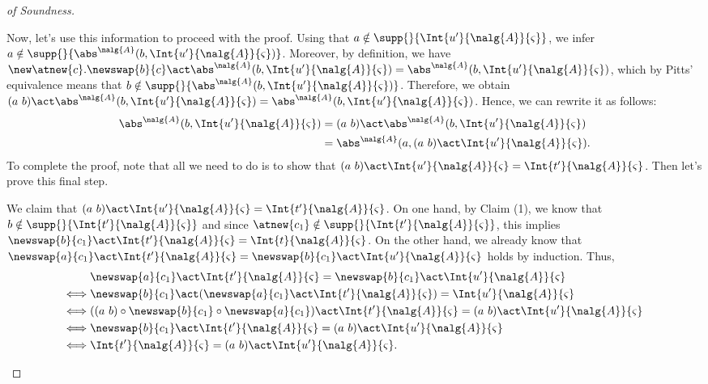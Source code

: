 \begin{proof}[of Soundness]
\begin{itemize}
            Now, let's use this information to proceed with the proof. Using that $a\notin\supp{}{\Int{u'}{\nalg{A}}{\varsigma}}$, we infer $a\notin\supp{}{\abs^{\nalg{A}}(b, \Int{u'}{\nalg{A}}{\varsigma})}$. Moreover, by definition, we have $\new \atnew{c}. \newswap{b}{c}\act \abs^{\nalg{A}}(b, \Int{u'}{\nalg{A}}{\varsigma}) = \abs^{\nalg{A}}(b, \Int{u'}{\nalg{A}}{\varsigma})$, which by Pitts' equivalence means that $b \notin\supp{}{\abs^{\nalg{A}}(b, \Int{u'}{\nalg{A}}{\varsigma})}$. Therefore, we obtain $(a \ b) \act \abs^{\nalg{A}}(b, \Int{u'}{\nalg{A}}{\varsigma}) = \abs^{\nalg{A}}(b, \Int{u'}{\nalg{A}}{\varsigma})$. Hence, we can rewrite it  as follows:
            \begin{align*}
                \abs^{\nalg{A}}(b,\Int{u'}{\nalg{A}}{\varsigma}) &= (a \ b)\act\abs^{\nalg{A}}(b,\Int{u'}{\nalg{A}}{\varsigma}) \\
                &= \abs^{\nalg{A}}(a,(a \ b)\act \Int{u'}{\nalg{A}}{\varsigma}).
            \end{align*}
            To complete the proof, note that all we need to do is to show that $(a \ b) \act \Int{u'}{\nalg{A}}{\varsigma} = \Int{t'}{\nalg{A}}{\varsigma}$. Then let's prove this final step.

            \begin{claim}[2]
                We claim that $(a \ b)\act \Int{u'}{\nalg{A}}{\varsigma} = \Int{t'}{\nalg{A}}{\varsigma}$. On one hand, by Claim (1), we know that $b\notin\supp{}{\Int{t'}{\nalg{A}}{\varsigma}}$ and since $\atnew{c_1}\notin\supp{}{\Int{t'}{\nalg{A}}{\varsigma}}$, this implies $\newswap{b}{c_1}\act \Int{t'}{\nalg{A}}{\varsigma} = \Int{t}{\nalg{A}}{\varsigma}$. On the other hand, we already know that $\newswap{a}{c_1}\act\Int{t'}{\nalg{A}}{\varsigma} = \newswap{b}{c_1}\act\Int{u'}{\nalg{A}}{\varsigma}$ holds by induction. Thus,
                \begin{align*}
                    & \newswap{a}{c_1}\act\Int{t'}{\nalg{A}}{\varsigma} =  \newswap{b}{c_1}\act\Int{u'}{\nalg{A}}{\varsigma} \\
                    \Longleftrightarrow{} & \newswap{b}{c_1}\act(\newswap{a}{c_1}\act\Int{t'}{\nalg{A}}{\varsigma}) =  \Int{u'}{\nalg{A}}{\varsigma}\\
                    \Longleftrightarrow{}& ((a \ b)\circ\newswap{b}{c_1}\circ\newswap{a}{c_1})\act\Int{t'}{\nalg{A}}{\varsigma} =  (a \ b)\act\Int{u'}{\nalg{A}}{\varsigma}\\
                    \Longleftrightarrow{}& \newswap{b}{c_1}\act\Int{t'}{\nalg{A}}{\varsigma} =  (a \ b)\act\Int{u'}{\nalg{A}}{\varsigma}\\
                    \Longleftrightarrow{}& \Int{t'}{\nalg{A}}{\varsigma} =  (a \ b)\act\Int{u'}{\nalg{A}}{\varsigma}.
                \end{align*}
            \end{claim}


\end{itemize}
\end{proof}
